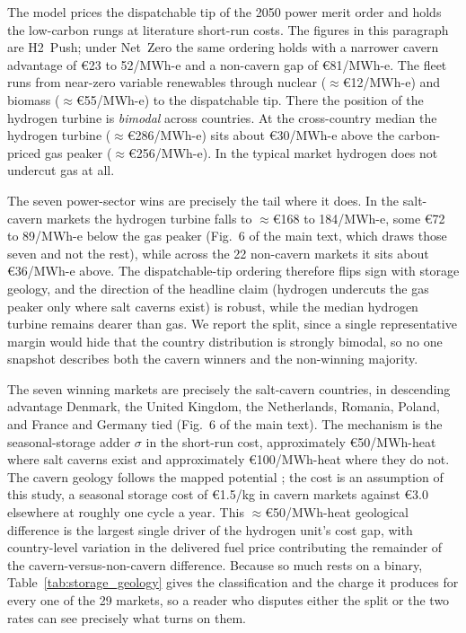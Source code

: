 The model prices the dispatchable tip of the 2050 power merit order and holds the
low-carbon rungs at literature short-run costs. The figures in this paragraph are H2~Push;
under Net~Zero the same ordering holds with a narrower cavern advantage of \euro{}23 to
52/MWh-e and a non-cavern gap of \euro{}81/MWh-e. The fleet runs from
near-zero variable renewables through nuclear ($\approx$\euro{}12/MWh-e) and biomass
($\approx$\euro{}55/MWh-e) to the dispatchable tip. There the position of
the hydrogen turbine is \emph{bimodal} across countries. At the cross-country median the hydrogen turbine
($\approx$\euro{}286/MWh-e) sits about \euro{}30/MWh-e above the carbon-priced
gas peaker ($\approx$\euro{}256/MWh-e). In the typical market hydrogen does not
undercut gas at all.

The seven power-sector wins are precisely the tail where it does. In the salt-cavern
markets the hydrogen turbine falls to
$\approx$\euro{}168 to 184/MWh-e, some \euro{}72 to 89/MWh-e below the gas peaker
(Fig.~6 of the main text, which draws those seven and not the rest), while across the 22
non-cavern markets it sits about \euro{}36/MWh-e above. The dispatchable-tip ordering therefore flips sign with
storage geology, and the direction of the headline claim (hydrogen undercuts the
gas peaker only where salt caverns exist) is robust, while the median hydrogen
turbine remains dearer than gas. We report the split, since a single representative margin would hide that the country distribution is strongly bimodal, so no one
snapshot describes both the cavern winners and the non-winning majority.


The seven winning markets are precisely the salt-cavern countries, in descending
advantage Denmark, the United Kingdom, the Netherlands, Romania, Poland, and France and
Germany tied (Fig.~6 of the main text). The mechanism is the seasonal-storage adder $\sigma$ in the short-run cost,
approximately \euro{}50/MWh-heat where salt caverns exist and approximately
\euro{}100/MWh-heat where they do not. The cavern geology follows the mapped potential
\citep{Caglayan2020caverns}; the cost is an assumption of this study, a seasonal storage
cost of \euro{}1.5/kg in cavern markets against \euro{}3.0 elsewhere at roughly one
cycle a year. This $\approx$\euro{}50/MWh-heat geological difference is the largest
single driver of the hydrogen unit's cost gap, with country-level variation in the
delivered fuel price contributing the remainder of the cavern-versus-non-cavern
difference. Because so much rests on a binary, Table~\ref{tab:storage_geology} gives the
classification and the charge it produces for every one of the 29 markets, so a reader who
disputes either the split or the two rates can see precisely what turns on them.

